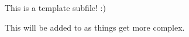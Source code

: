 \documentclass[../OpenAppliedMusicTheory.tex]{subfiles}
\begin{document}
    
    This is a template subfile! :)

    This will be added to as things get more complex.
\end{document}
